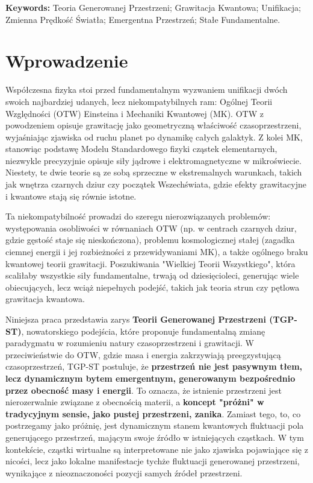 \documentclass[11pt,a4paper]{article}
\begin{document}
\vspace{1cm} 


\noindent\textbf{Keywords:} Teoria Generowanej Przestrzeni; Grawitacja Kwantowa; Unifikacja; Zmienna Prędkość Światła; Emergentna Przestrzeń; Stałe Fundamentalne.

\newpage 

\section{Wprowadzenie}
\label{sec:Wprowadzenie}

Współczesna fizyka stoi przed fundamentalnym wyzwaniem unifikacji dwóch swoich najbardziej udanych, lecz niekompatybilnych ram: Ogólnej Teorii Względności (OTW) Einsteina i Mechaniki Kwantowej (MK). OTW z powodzeniem opisuje grawitację jako geometryczną właściwość czasoprzestrzeni, wyjaśniając zjawiska od ruchu planet po dynamikę całych galaktyk. Z kolei MK, stanowiąc podstawę Modelu Standardowego fizyki cząstek elementarnych, niezwykle precyzyjnie opisuje siły jądrowe i elektromagnetyczne w mikroświecie. Niestety, te dwie teorie są ze sobą sprzeczne w ekstremalnych warunkach, takich jak wnętrza czarnych dziur czy początek Wszechświata, gdzie efekty grawitacyjne i kwantowe stają się równie istotne.

Ta niekompatybilność prowadzi do szeregu nierozwiązanych problemów: występowania osobliwości w równaniach OTW (np. w centrach czarnych dziur, gdzie gęstość staje się nieskończona), problemu kosmologicznej stałej (zagadka ciemnej energii i jej rozbieżności z przewidywaniami MK), a także ogólnego braku kwantowej teorii grawitacji. Poszukiwania "Wielkiej Teorii Wszystkiego", która scaliłaby wszystkie siły fundamentalne, trwają od dziesięcioleci, generując wiele obiecujących, lecz wciąż niepełnych podejść, takich jak teoria strun czy pętlowa grawitacja kwantowa.

Niniejsza praca przedstawia zarys \textbf{Teorii Generowanej Przestrzeni (TGP-ST)}, nowatorskiego podejścia, które proponuje fundamentalną zmianę paradygmatu w rozumieniu natury czasoprzestrzeni i grawitacji. W przeciwieństwie do OTW, gdzie masa i energia zakrzywiają preegzystującą czasoprzestrzeń, TGP-ST postuluje, że \textbf{przestrzeń nie jest pasywnym tłem, lecz dynamicznym bytem emergentnym, generowanym bezpośrednio przez obecność masy i energii}. To oznacza, że istnienie przestrzeni jest nierozerwalnie związane z obecnością materii, a \textbf{koncept "próżni" w tradycyjnym sensie, jako pustej przestrzeni, zanika}. Zamiast tego, to, co postrzegamy jako próżnię, jest dynamicznym stanem kwantowych fluktuacji pola generującego przestrzeń, mającym swoje źródło w istniejących cząstkach. W tym kontekście, cząstki wirtualne są interpretowane nie jako zjawiska pojawiające się z nicości, lecz jako lokalne manifestacje tychże fluktuacji generowanej przestrzeni, wynikające z nieoznaczoności pozycji samych źródeł przestrzeni.
\end{document}
